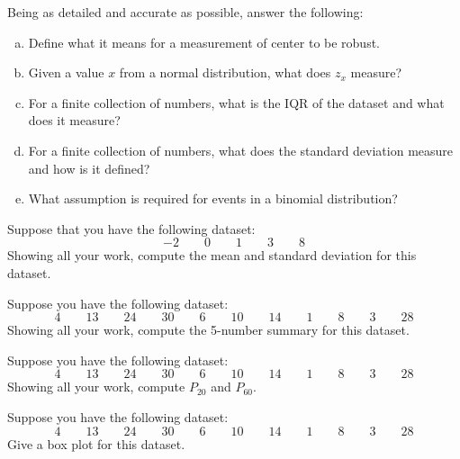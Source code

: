 \documentclass[12pt,letterpaper]{exam}
\begin{document}
\begin{questions}
\newpage
\question[10] Being as detailed and accurate as possible, answer the following:
	\begin{enumerate}[(a)]
	\item Define what it means for a measurement of center to be robust. \vfill
	\item Given a value $x$ from a normal distribution, what does $z_x$ measure? \vfill
	\item For a finite collection of numbers, what is the IQR of the dataset and what does it measure? \vfill
	\item For a finite collection of numbers, what does the standard deviation measure and how is it defined? \vfill
	\item What assumption is required for events in a binomial distribution? \vfill
	\end{enumerate}



\newpage
\question[10] Suppose that you have the following dataset:
	\[
	-2 \qquad 0 \qquad 1 \qquad 3 \qquad 8
	\]
Showing all your work, compute the mean and standard deviation for this dataset. 



\newpage
\question[10] Suppose you have the following dataset:
	\[
	4 \qquad 13 \qquad 24 \qquad 30 \qquad 6 \qquad 10 \qquad 14 \qquad 1 \qquad 8 \qquad 3 \qquad 28
	\]
Showing all your work, compute the 5-number summary for this dataset.



\newpage
\question[10] Suppose you have the following dataset:
	\[
	4 \qquad 13 \qquad 24 \qquad 30 \qquad 6 \qquad 10 \qquad 14 \qquad 1 \qquad 8 \qquad 3 \qquad 28
	\]
Showing all your work, compute $P_{20}$ and $P_{60}$. 



\newpage
\question[10] Suppose you have the following dataset:
	\[
	4 \qquad 13 \qquad 24 \qquad 30 \qquad 6 \qquad 10 \qquad 14 \qquad 1 \qquad 8 \qquad 3 \qquad 28
	\]
Give a box plot for this dataset. 




\end{questions}
\end{document}
